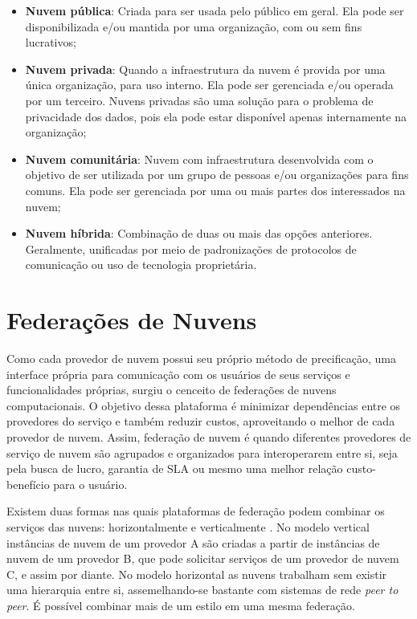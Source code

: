 \begin{itemize}
	\item \textbf{Nuvem pública}: Criada para ser usada pelo público em geral. Ela pode ser disponibilizada e/ou mantida por uma organização, com ou sem fins lucrativos;
	\item \textbf{Nuvem privada}: Quando a infraestrutura da nuvem é provida por uma única organização, para uso interno. Ela pode ser gerenciada e/ou operada por um terceiro. Nuvens privadas são uma solução para o problema de privacidade dos dados, pois ela pode estar disponível apenas internamente na organização;
	\item \textbf{Nuvem comunitária}: Nuvem com infraestrutura desenvolvida com o objetivo de ser utilizada por um grupo de pessoas e/ou organizações para fins comuns. Ela pode ser gerenciada por uma ou mais partes dos interessados na nuvem;
	\item \textbf{Nuvem híbrida}: Combinação de duas ou mais das opções anteriores. Geralmente, unificadas por meio de padronizações de protocolos de comunicação ou uso de tecnologia proprietária.
\end{itemize}

\section{Federações de Nuvens}

Como cada provedor de nuvem possui seu próprio método de precificação, uma interface própria para comunicação com os usuários de seus serviços e funcionalidades próprias, surgiu o cenceito de federações de nuvens computacionais. O objetivo dessa plataforma é minimizar dependências entre os provedores do serviço e também reduzir custos, aproveitando o melhor de cada provedor de nuvem. Assim, federação de nuvem é quando diferentes provedores de serviço de nuvem são agrupados e organizados para interoperarem entre si, seja pela busca de lucro, garantia de \acrshort{SLA} ou mesmo uma melhor relação custo-benefício para o usuário.

Existem duas formas nas quais plataformas de federação podem combinar os serviços das nuvens: horizontalmente e verticalmente \cite{5557976}\cite{7835207}. No modelo vertical instâncias de nuvem de um provedor A são criadas a partir de instâncias de nuvem de um provedor B, que pode solicitar serviços de um provedor de nuvem C, e assim por diante. No modelo horizontal as nuvens trabalham sem existir uma hierarquia entre si, assemelhando-se bastante com sistemas de rede \textit{peer to peer}. É possível combinar mais de um estilo em uma mesma federação.

